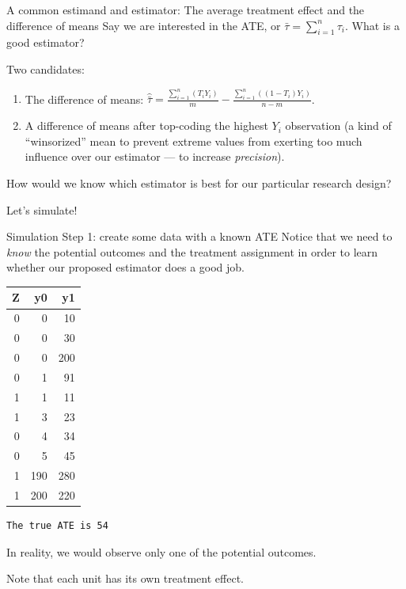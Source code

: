\documentclass[
  ignorenonframetext,
]{beamer}
\begin{document}
\begin{frame}{A common estimand and estimator: The average treatment
effect and the difference of means}
\protect\hypertarget{a-common-estimand-and-estimator-the-average-treatment-effect-and-the-difference-of-means}{}
Say we are interested in the ATE, or
\(\bar{\tau}=\sum_{i=1}^n \tau_{i}\). What is a good estimator?

Two candidates:

\begin{enumerate}
\item
  The difference of means:
  \(\hat{\bar{\tau}} = \frac{\sum_{i=1}^n (T_i Y_i)}{m} - \frac{\sum_{i=1}^n ( ( 1 - T_i) Y_i)}{n-m}\).
\item
  A difference of means after top-coding the highest \(Y_i\) observation
  (a kind of ``winsorized'' mean to prevent extreme values from exerting
  too much influence over our estimator --- to increase
  \emph{precision}).
\end{enumerate}

How would we know which estimator is best for our particular research
design?

Let's simulate!
\end{frame}

\begin{frame}[fragile]{Simulation Step 1: create some data with a known
ATE}
\protect\hypertarget{simulation-step-1-create-some-data-with-a-known-ate}{}
Notice that we need to \emph{know} the potential outcomes and the
treatment assignment in order to learn whether our proposed estimator
does a good job.

\scriptsize\normalsize

\begin{center}
\scriptsize
\begin{tabular}{r|r|r}
\hline
Z & y0 & y1\\
\hline
0 & 0 & 10\\
\hline
0 & 0 & 30\\
\hline
0 & 0 & 200\\
\hline
0 & 1 & 91\\
\hline
1 & 1 & 11\\
\hline
1 & 3 & 23\\
\hline
0 & 4 & 34\\
\hline
0 & 5 & 45\\
\hline
1 & 190 & 280\\
\hline
1 & 200 & 220\\
\hline
\end{tabular}

\normalsize
\end{center}

\scriptsize

\begin{verbatim}
The true ATE is 54
\end{verbatim}

\normalsize

In reality, we would observe only one of the potential outcomes.

Note that each unit has its own treatment effect.
\end{frame}
\end{document}

